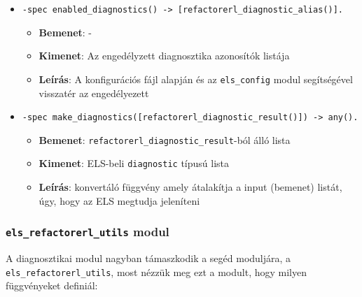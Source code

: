 \begin{itemize}
   
    \item \lstinline{-spec enabled_diagnostics() -> [refactorerl_diagnostic_alias()].} 
        \begin{itemize}
            \item \textbf{Bemenet}: -
            \item \textbf{Kimenet}: Az engedélyzett diagnosztika azonosítók listája
            \item \textbf{Leírás}:   A konfigurációs fájl alapján és az \lstinline{els_config} modul segítségével visszatér az engedélyezett 
        \end{itemize}
    
    
    \item \lstinline{-spec make_diagnostics([refactorerl_diagnostic_result()]) -> any().} 
        \begin{itemize}
            \item \textbf{Bemenet}: \lstinline{refactorerl_diagnostic_result}-ból álló lista
            \item \textbf{Kimenet}: ELS-beli \lstinline{diagnostic} típusú lista
            \item \textbf{Leírás}: konvertáló függvény amely átalakítja a input (bemenet) listát, úgy, hogy az ELS megtudja jeleníteni
        \end{itemize}
    \end{itemize}
    
    
\subsubsection{\lstinline{els_refactorerl_utils} modul}
A diagnosztikai modul nagyban támaszkodik a segéd moduljára, a \lstinline{els_refactorerl_utils}, most nézzük meg ezt a modult, hogy milyen függvényeket definiál:

